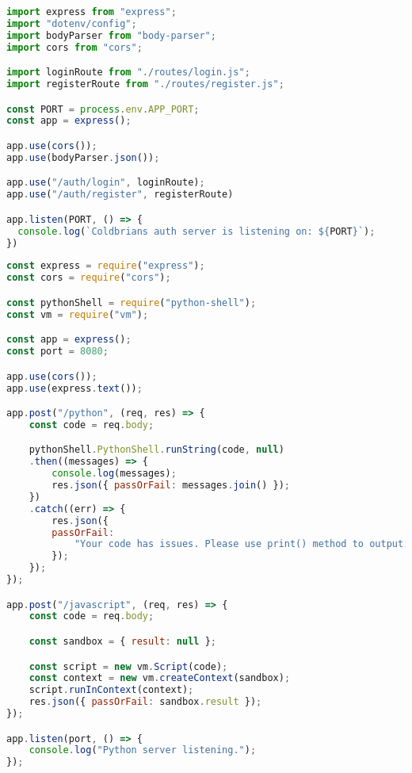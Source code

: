 \begin{lstlisting}[language=JavaScript, frame=single, caption={ExpressJS auth сервер}]
import express from "express";
import "dotenv/config";
import bodyParser from "body-parser";
import cors from "cors";

import loginRoute from "./routes/login.js";
import registerRoute from "./routes/register.js";

const PORT = process.env.APP_PORT;
const app = express();

app.use(cors());
app.use(bodyParser.json());

app.use("/auth/login", loginRoute);
app.use("/auth/register", registerRoute)

app.listen(PORT, () => {
  console.log(`Coldbrians auth server is listening on: ${PORT}`);
})

\end{lstlisting}

\begin{lstlisting}[language=JavaScript, frame=single, caption={python-shell санг ашиглаж буй байдал}]
const express = require("express");
const cors = require("cors");

const pythonShell = require("python-shell");
const vm = require("vm");

const app = express();
const port = 8080;

app.use(cors());
app.use(express.text());

app.post("/python", (req, res) => {
    const code = req.body;

    pythonShell.PythonShell.runString(code, null)
    .then((messages) => {
        console.log(messages);
        res.json({ passOrFail: messages.join() });
    })
    .catch((err) => {
        res.json({
        passOrFail:
            "Your code has issues. Please use print() method to output.",
        });
    });
}); 

app.post("/javascript", (req, res) => {
    const code = req.body;

    const sandbox = { result: null };

    const script = new vm.Script(code);
    const context = new vm.createContext(sandbox);
    script.runInContext(context);
    res.json({ passOrFail: sandbox.result });
});

app.listen(port, () => {
    console.log("Python server listening.");
});
    
\end{lstlisting}
